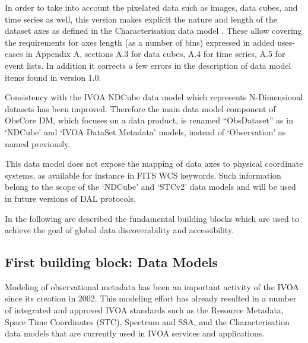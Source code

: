 \documentclass[11pt,a4paper]{ivoa}
\begin{document}
In order to take into account the pixelated data such as images, data cubes, and time series as well, this version makes
explicit the nature and length of the dataset axes as defined in the Characterisation data model
\citep{2008ivoa.spec.0325L}. These allow covering the requirements for axes length (as a number of bins) expressed in
added uses-cases in Appendix A, sections A.3 for data cubes, A.4 for time series, A.5 for event lists. In addition it
corrects a few errors in the description of data model items found in version 1.0.

Consistency with the IVOA NDCube data model which represents N-Dimensional datasets has been improved. Therefore the
main data model component of ObsCore DM, which focuses on a data product, is renamed ``ObsDataset'' as in `NDCube' and
`IVOA DataSet Metadata' models, instead of `Observation' as named previously. 

This data model does not expose the mapping of data axes to physical coordinate systems, as available for instance in
FITS WCS keywords. Such information belong to the scope of the `NDCube' and `STCv2' data models and will be used in
future versions of DAL protocols.

In the following are described the fundamental building blocks which are used to achieve the goal of global data
discoverability and accessibility. 

\subsection{First building block: Data Models}
Modeling of observational metadata has been an important activity of the IVOA since its creation in 2002.  This modeling
effort has already resulted in a number of integrated and approved IVOA standards such as the Resource Metadata, Space
Time Coordinates (STC), Spectrum and SSA, and the Characterisation data models that are currently used in IVOA services
and applications.
\end{document}
